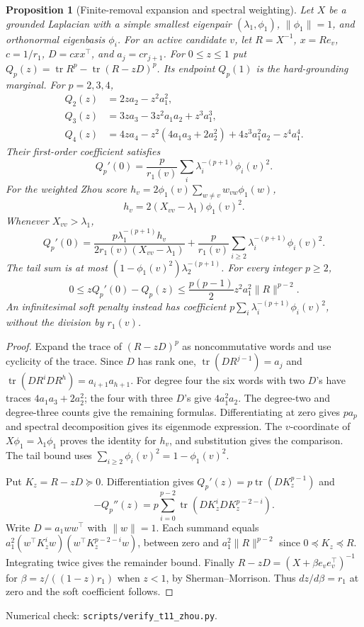 \documentclass[11pt]{article}
\newtheorem{proposition}[theorem]{Proposition}
\DeclareMathOperator{\tr}{tr}
\begin{document}
\begin{proposition}[Finite-removal expansion and spectral weighting]
\label{prop:zhoutaylor}
Let $X$ be a grounded Laplacian with a simple smallest eigenpair
$(\lambda_1,\phi_1)$, $\|\phi_1\|=1$, and orthonormal eigenbasis
$\phi_i$. For an active candidate $v$, let $R=X^{-1}$,
$x=Re_v$, $c=1/r_1$, $D=cxx^\top$, and $a_j=cr_{j+1}$.
For $0\leq z\leq1$ put
$Q_p(z)=\tr R^p-\tr(R-zD)^p$. Its endpoint $Q_p(1)$ is the
hard-grounding marginal. For $p=2,3,4$,
\begin{align*}
 Q_2(z)&=2za_2-z^2a_1^2,\\
 Q_3(z)&=3za_3-3z^2a_1a_2+z^3a_1^3,\\
 Q_4(z)&=4za_4-z^2(4a_1a_3+2a_2^2)
                       +4z^3a_1^2a_2-z^4a_1^4.
\end{align*}
Their first-order coefficient satisfies
\[
 Q_p'(0)=\frac p{r_1(v)}\sum_i\lambda_i^{-(p+1)}\phi_i(v)^2.
\]
For the weighted Zhou score
$h_v=2\phi_1(v)\sum_{w\ne v}w_{vw}\phi_1(w)$,
\[
 h_v=2(X_{vv}-\lambda_1)\phi_1(v)^2.
\]
Whenever $X_{vv}>\lambda_1$,
\[
 Q_p'(0)=\frac{p\lambda_1^{-(p+1)}h_v}
                    {2r_1(v)(X_{vv}-\lambda_1)}
       +\frac p{r_1(v)}\sum_{i\geq2}
                          \lambda_i^{-(p+1)}\phi_i(v)^2.
\]
The tail sum is at most
$(1-\phi_1(v)^2)\lambda_2^{-(p+1)}$.
For every integer $p\geq2$,
\[
 0\leq zQ_p'(0)-Q_p(z)
 \leq\frac{p(p-1)}2 z^2 a_1^2\|R\|^{p-2}.
\]
An infinitesimal soft penalty instead has coefficient
$p\sum_i\lambda_i^{-(p+1)}\phi_i(v)^2$, without the division by
$r_1(v)$.
\end{proposition}
\begin{proof}
Expand the trace of $(R-zD)^p$ as noncommutative words and use
cyclicity of the trace. Since $D$ has rank one,
$\tr(DR^{j-1})=a_j$ and
$\tr(DR^iDR^h)=a_{i+1}a_{h+1}$.
For degree four the six words with two $D$'s have traces
$4a_1a_3+2a_2^2$; the four with three $D$'s give
$4a_1^2a_2$. The degree-two and degree-three counts give the
remaining formulas. Differentiating at zero gives $pa_p$ and
spectral decomposition gives its eigenmode expression. The
$v$-coordinate of $X\phi_1=\lambda_1\phi_1$ proves the identity
for $h_v$, and substitution gives the comparison. The tail bound
uses $\sum_{i\geq2}\phi_i(v)^2=1-\phi_1(v)^2$.

Put $K_z=R-zD\succeq0$. Differentiation gives
$Q_p'(z)=p\tr(DK_z^{p-1})$ and
\[
 -Q_p''(z)=p\sum_{i=0}^{p-2}\tr(DK_z^iDK_z^{p-2-i}).
\]
Write $D=a_1ww^\top$ with $\|w\|=1$. Each summand equals
$a_1^2(w^\top K_z^iw)(w^\top K_z^{p-2-i}w)$, between zero
and $a_1^2\|R\|^{p-2}$ since $0\preceq K_z\preceq R$.
Integrating twice gives the remainder bound. Finally
$R-zD=(X+\beta e_ve_v^\top)^{-1}$ for
$\beta=z/((1-z)r_1)$ when $z<1$, by Sherman--Morrison.
Thus $dz/d\beta=r_1$ at zero and the soft coefficient follows.
\end{proof}
\noindent Numerical check: \texttt{scripts/verify\_t11\_zhou.py}.
\end{document}
